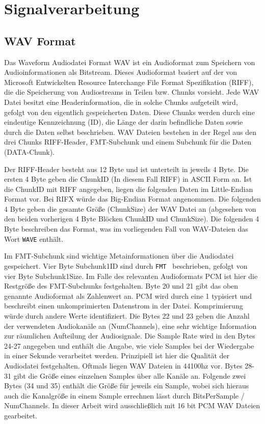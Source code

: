 
\section{Signalverarbeitung} \label{chap:signalprocessing}

\subsection{WAV Format \label{sub:WAV} \cite{brLibWav} \cite{Sapp}}
Das Waveform Audiodatei Format WAV ist ein Audioformat zum Speichern von Audioinformationen als Bitstream. Dieses Audioformat basiert auf der von Microsoft 
Entwickelten Resource Interchange File Format Spezifikation (RIFF), die die Speicherung von Audiostreams in Teilen bzw. Chunks vorsieht. Jede WAV Datei besitzt eine Headerinformation, die in solche Chunks aufgeteilt wird, gefolgt von den eigentlich gespeicherten Daten. Diese Chunks werden durch eine eindeutige Kennzeichnung (ID), die Länge der darin befindliche Daten sowie durch die Daten selbst beschrieben. WAV Dateien bestehen in der Regel aus den drei Chunks RIFF-Header, FMT-Subchunk und einem Subchunk für die Daten (DATA-Chunk).

Der RIFF-Header besteht aus 12 Byte und ist unterteilt in jeweils 4 Byte. Die ersten 4 Byte geben die ChunkID (In diesem Fall RIFF) in ASCII Form an. Ist die ChunkID mit RIFF angegeben, liegen die folgenden Daten im Little-Endian Format vor. Bei RIFX würde das Big-Endian Format angenommen.
Die folgenden 4 Byte geben die gesamte Größe (ChunkSize) der WAV Datei an (abgesehen von den beiden vorherigen 4 Byte Blöcken ChunkID und ChunkSize). Die folgenden 4 Byte beschreiben das Format, was im vorliegenden Fall von WAV-Dateien das Wort \texttt{WAVE} enthält.

Im FMT-Subchunk sind wichtige Metainformationen über die Audiodatei gespeichert. 
Vier Byte Subchunk1ID sind durch \texttt{FMT } beschrieben, gefolgt von vier Byte Subchunk1Size. Im Falle des relevanten Audioformats PCM ist hier die Restgröße des FMT-Subchunks festgehalten. Byte 20 und 21 gibt das oben genannte Audioformat als Zahlenwert an. PCM wird durch eine 1 typisiert und beschreibt einen unkomprimierten Datenstrom in der Datei. Komprimierung würde durch andere Werte identifiziert. Die Bytes 22 und 23 geben die Anzahl der verwendeten Audiokanäle an (NumChannels), eine sehr wichtige Information zur räumlichen Aufteilung der Audiosignale. Die Sample Rate wird in den Bytes 24-27 angegeben und enthält die Angabe, wie viele Samples bei der Wiedergabe in einer Sekunde verarbeitet werden. Prinzipiell ist hier die Qualität der Audiodatei festgehalten. Oftmals liegen WAV Dateien in 44100hz vor. Bytes 28-31 gibt die Größe eines einzelnen Samples über alle Kanäle an. Folgende zwei Bytes (34 und 35) enthält die Größe für jeweils ein Sample, wobei sich hieraus auch die Kanalgröße in einem Sample errechnen lässt durch BitsPerSample / NumChannels. In dieser Arbeit wird ausschließlich mit 16 bit PCM WAV Dateien gearbeitet.


